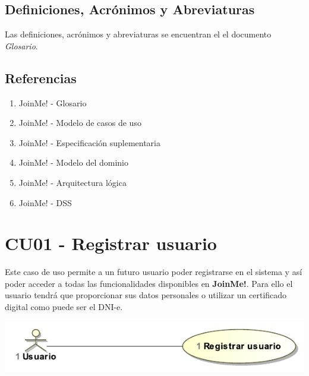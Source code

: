 \documentclass[12pt, a4paper, titlepage]{article}
\begin{document}
\subsection{Definiciones, Acrónimos y Abreviaturas}

Las definiciones, acrónimos y abreviaturas se encuentran el el documento \textit{Glosario}.

\subsection{Referencias}

\begin{enumerate}
	\item JoinMe! - Glosario
    \item JoinMe! - Modelo de casos de uso
    \item JoinMe! - Especificación suplementaria
    \item JoinMe! - Modelo del dominio
    \item JoinMe! - Arquitectura lógica
    \item JoinMe! - DSS

\end{enumerate}

\section{CU01 - Registrar usuario}

Este caso de uso permite a un futuro usuario poder registrarse en el sistema y así poder acceder a todas las funcionalidades disponibles en \textbf{JoinMe!}. Para ello el usuario tendrá que proporcionar sus datos personales o utilizar un certificado digital como puede ser el DNI-e.

\begin{center}
	\includegraphics{Imagenes/RegistrarUsuarioCU}
\end{center}
\end{document}
